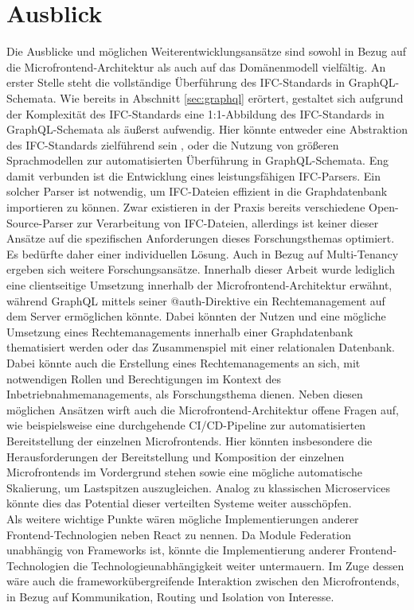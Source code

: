 \section{Ausblick}
Die Ausblicke und möglichen Weiterentwicklungsansätze sind sowohl in Bezug auf die Microfrontend-Architektur als auch auf das Domänenmodell vielfältig.
An erster Stelle steht die vollständige Überführung des IFC-Standards in GraphQL-Schemata. Wie bereits in Abschnitt \ref{sec:graphql} erörtert, gestaltet sich aufgrund der Komplexität des IFC-Standards
eine 1:1-Abbildung des IFC-Standards in GraphQL-Schemata als äußerst aufwendig. Hier könnte entweder eine Abstraktion des IFC-Standards zielführend sein \cite{wolf_20206_graphql}, oder die Nutzung von
größeren Sprachmodellen zur automatisierten Überführung in GraphQL-Schemata. Eng damit verbunden ist die Entwicklung eines leistungsfähigen IFC-Parsers. Ein solcher Parser ist notwendig, um IFC-Dateien effizient in die Graphdatenbank importieren zu können.
Zwar existieren in der Praxis bereits verschiedene Open-Source-Parser \cite{wolf:2025:ifc2graphql} zur Verarbeitung von IFC-Dateien, allerdings ist keiner dieser Ansätze auf die spezifischen Anforderungen dieses Forschungsthemas optimiert. Es bedürfte daher einer individuellen Lösung.
Auch in Bezug auf Multi-Tenancy ergeben sich weitere Forschungsansätze. Innerhalb dieser Arbeit wurde lediglich eine clientseitige Umsetzung
innerhalb der Microfrontend-Architektur erwähnt, während GraphQL mittels seiner @auth-Direktive ein Rechtemanagement auf dem Server ermöglichen könnte. Dabei könnten der Nutzen und eine mögliche Umsetzung eines Rechtemanagements innerhalb
einer Graphdatenbank thematisiert werden oder das Zusammenspiel mit einer relationalen Datenbank. Dabei könnte auch die Erstellung eines Rechtemanagements an sich, mit notwendigen Rollen und Berechtigungen im Kontext des Inbetriebnahmemanagements, als Forschungsthema dienen.
Neben diesen möglichen Ansätzen wirft auch die Microfrontend-Architektur offene Fragen auf, wie beispielsweise eine durchgehende \ac{CI/CD}-Pipeline zur automatisierten Bereitstellung der einzelnen Microfrontends.
Hier könnten insbesondere die Herausforderungen der Bereitstellung und Komposition der einzelnen Microfrontends im Vordergrund stehen sowie eine mögliche automatische Skalierung, um Lastspitzen auszugleichen. Analog zu klassischen Microservices könnte dies das Potential dieser verteilten Systeme weiter ausschöpfen. \\
Als weitere wichtige Punkte wären mögliche Implementierungen anderer Frontend-Technologien neben React zu nennen. Da Module Federation unabhängig von Frameworks ist, könnte die Implementierung anderer Frontend-Technologien die Technologieunabhängigkeit weiter untermauern. Im Zuge dessen wäre auch die frameworkübergreifende Interaktion zwischen den Microfrontends, in Bezug auf Kommunikation, Routing und Isolation von Interesse. \newline
